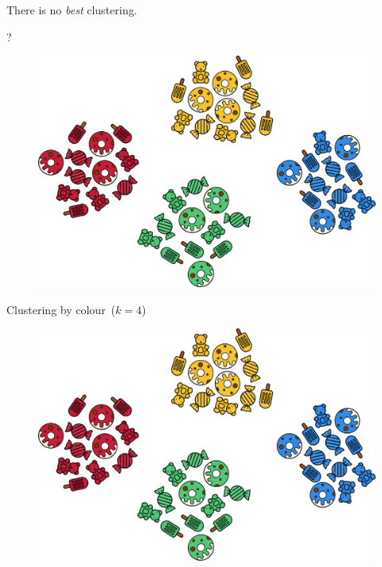 \documentclass[aspectratio=169]{beamer}
\begin{document}
  \begin{frame}{}
    \begin{center}
      \begin{huge}
        There is no \emph{best} clustering.
      \end{huge}
    \end{center}
  \end{frame}

  \begin{frame}{?}
    \begin{figure}
      \includegraphics[width=0.75\linewidth]{Figures/Clustering_by_colour}
    \end{figure}
  \end{frame}

  \begin{frame}{Clustering by colour~($k = 4$)}
    \begin{figure}
      \includegraphics[width=0.75\linewidth]{Figures/Clustering_by_colour}
    \end{figure}
  \end{frame}
\end{document}
